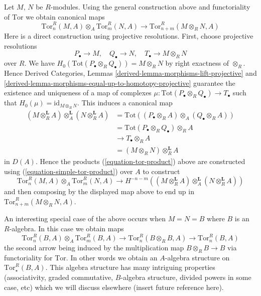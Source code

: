 \medskip\noindent
Let $M$, $N$ be $R$-modules. Using the general construction above and
functoriality of $\text{Tor}$ we obtain canonical maps
\begin{equation}
\label{equation-tor-product}
\text{Tor}^R_n(M, A) \otimes_A \text{Tor}^R_m(N, A)
\longrightarrow \text{Tor}_{n + m}^R(M \otimes_R N, A)
\end{equation}
Here is a direct construction using projective resolutions. First, choose
projective resolutions
$$
P_\bullet \to M, \quad Q_\bullet \to N, \quad T_\bullet \to M \otimes_R N
$$
over $R$. We have
$H_0(\text{Tot}(P_\bullet \otimes_R Q_\bullet)) = M \otimes_R N$ by
right exactness of $\otimes_R$. Hence
Derived Categories, Lemmas \ref{derived-lemma-morphisms-lift-projective} and
\ref{derived-lemma-morphisms-equal-up-to-homotopy-projective}
guarantee the existence and uniqueness of a map of complexes
$\mu : \text{Tot}(P_\bullet \otimes_R Q_\bullet) \to T_\bullet$ such that
$H_0(\mu) = \text{id}_{M \otimes_R N}$. This induces a canonical map
\begin{align*}
(M \otimes_R^{\mathbf{L}} A) \otimes_A^{\mathbf{L}}
(N \otimes_R^{\mathbf{L}} A)
& =
\text{Tot}((P_\bullet \otimes_R A) \otimes_A (Q_\bullet \otimes_R A)) \\
& =
\text{Tot}(P_\bullet \otimes_R Q_\bullet) \otimes_R A \\
& \to
T_\bullet \otimes_R A \\
& = (M \otimes_R N) \otimes_R^{\mathbf{L}} A
\end{align*}
in $D(A)$. Hence the products (\ref{equation-tor-product}) above are
constructed using (\ref{equation-simple-tor-product}) over $A$ to construct
$$
\text{Tor}^R_n(M, A) \otimes_A \text{Tor}^R_m(N, A) \to
H^{-n-m}((M \otimes_R^{\mathbf{L}} A) \otimes_A^{\mathbf{L}}
(N \otimes_R^{\mathbf{L}} A))
$$
and then composing by the displayed map above to end up in
$\text{Tor}_{n + m}^R(M \otimes_R N, A)$.

\medskip\noindent
An interesting special case of the above occurs when $M = N = B$
where $B$ is an $R$-algebra. In this case we obtain maps
$$
\text{Tor}_n^R(B, A) \otimes_A \text{Tor}_m^R(B, A)
\longrightarrow
\text{Tor}_n^R(B \otimes_R B, A)
\longrightarrow
\text{Tor}_n^R(B, A)
$$
the second arrow being induced by the multiplication map
$B \otimes_R B \to B$ via functoriality for $\text{Tor}$.
In other words we obtain an $A$-algebra structure on
$\text{Tor}^R_{\star}(B, A)$. This algebra structure has many intriguing
properties (associativity, graded commutative, $B$-algebra structure,
divided powers in some case, etc) which we will discuss elsewhere (insert
future reference here).

